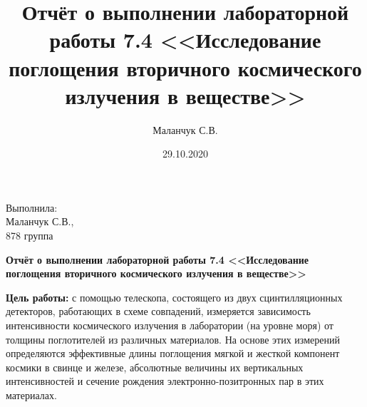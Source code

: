 \documentclass[12pt]{article}
\title{Отчёт о выполнении лабораторной работы 7.4 <<Исследование поглощения
  вторичного космического излучения в веществе>>}
\author{Маланчук С.В.}
\date{29.10.2020}
\begin{document}
\begin{flushright}
    Выполнила:
    \\
    Маланчук С.В.,
    \\
    878 группа
\end{flushright}

\begin{center}
    \begin{Large}
        \textbf{Отчёт о выполнении лабораторной работы 7.4 <<Исследование поглощения
  вторичного космического излучения в веществе>>}
    \end{Large}
\end{center}


\parindent=1cm \textbf{Цель работы:} с помощью телескопа, состоящего из двух
сцинтилляционных детекторов, работающих в схеме совпадений, измеряется
зависимость интенсивности космического излучения в лаборатории (на уровне моря)
от толщины поглотителей из различных материалов. На основе этих измерений
определяются эффективные длины поглощения мягкой и жесткой компонент космики в
свинце и железе, абсолютные величины их вертикальных интенсивностей  и сечение
рождения электронно-позитронных пар в этих материалах.
\end{document}
